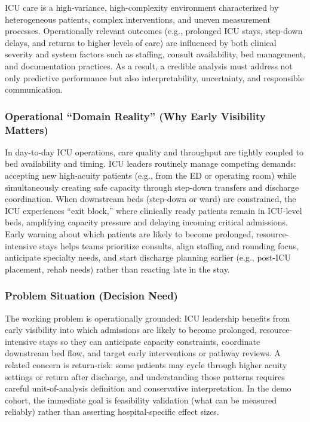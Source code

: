 \documentclass[12pt]{article}
\begin{document}
ICU care is a high-variance, high-complexity environment characterized by heterogeneous patients, complex interventions, and uneven measurement processes. Operationally relevant outcomes (e.g., prolonged ICU stays, step-down delays, and returns to higher levels of care) are influenced by both clinical severity and system factors such as staffing, consult availability, bed management, and documentation practices. As a result, a credible analysis must address not only predictive performance but also interpretability, uncertainty, and responsible communication.


\subsubsection*{Operational ``Domain Reality'' (Why Early Visibility Matters)}
In day-to-day ICU operations, care quality and throughput are tightly coupled to bed availability and timing. ICU leaders routinely manage competing demands: accepting new high-acuity patients (e.g., from the ED or operating room) while simultaneously creating safe capacity through step-down transfers and discharge coordination. When downstream beds (step-down or ward) are constrained, the ICU experiences ``exit block,'' where clinically ready patients remain in ICU-level beds, amplifying capacity pressure and delaying incoming critical admissions. Early warning about which patients are likely to become prolonged, resource-intensive stays helps teams prioritize consults, align staffing and rounding focus, anticipate specialty needs, and start discharge planning earlier (e.g., post-ICU placement, rehab needs) rather than reacting late in the stay.

\subsubsection*{Problem Situation (Decision Need)}
The working problem is operationally grounded: ICU leadership benefits from early visibility into which admissions are likely to become prolonged, resource-intensive stays so they can anticipate capacity constraints, coordinate downstream bed flow, and target early interventions or pathway reviews. A related concern is return-risk: some patients may cycle through higher acuity settings or return after discharge, and understanding those patterns requires careful unit-of-analysis definition and conservative interpretation. In the demo cohort, the immediate goal is feasibility validation (what can be measured reliably) rather than asserting hospital-specific effect sizes.
\end{document}
